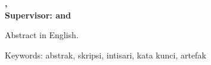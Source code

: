\newpage
{}
\vspace{10mm}
\normalsize
\justifying

\noindent
\textbf{\pnama, \ptitleen}
\textbf{
  \noindent
  \\Supervisor: \ppembimbingsatu
  \ifthenelse{\equal{\ppembimbingdua}{}}
  {} {\phantom{ }and \ppembimbingdua}
}

\vspace{5mm}

\indent
Abstract in English.

\vspace{5mm}
\noindent
Keywords: abstrak, skripsi, intisari, kata kunci, artefak
